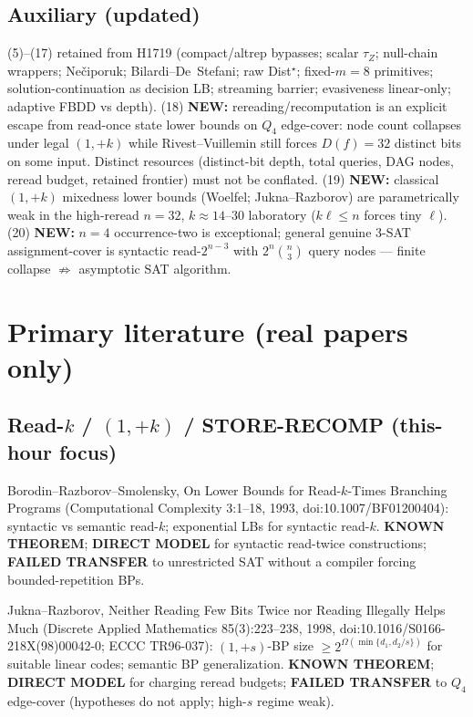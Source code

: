 \documentclass[11pt]{article}
\begin{document}
\subsection*{Auxiliary (updated)}
(5)--(17) retained from H1719 (compact/altrep bypasses; scalar $\tau_Z$; null-chain wrappers;
Ne\v{c}iporuk; Bilardi--De~Stefani; raw Dist$^\star$; fixed-$m=8$ primitives; solution-continuation
as decision LB; streaming barrier; evasiveness linear-only; adaptive FBDD vs depth).
(18) \textbf{NEW:} rereading/recomputation is an explicit escape from read-once state lower bounds
on $Q_4$ edge-cover: node count collapses under legal $(1,+k)$ while Rivest--Vuillemin still forces
$D(f)=32$ distinct bits on some input. Distinct resources (distinct-bit depth, total queries,
DAG nodes, reread budget, retained frontier) must not be conflated.
(19) \textbf{NEW:} classical $(1,+k)$ mixedness lower bounds (Woelfel; Jukna--Razborov) are
parametrically weak in the high-reread $n=32$, $k\approx14$--$30$ laboratory ($k\ell\le n$ forces
tiny $\ell$).
(20) \textbf{NEW:} $n=4$ occurrence-two is exceptional; general genuine 3-SAT assignment-cover
is syntactic read-$2^{n-3}$ with $2^n\binom{n}{3}$ query nodes --- finite collapse $\not\Rightarrow$
asymptotic SAT algorithm.

\section*{Primary literature (real papers only)}
\subsection*{Read-$k$ / $(1,+k)$ / STORE-RECOMP (this-hour focus)}
Borodin--Razborov--Smolensky, On Lower Bounds for Read-$k$-Times Branching Programs
(Computational Complexity 3:1--18, 1993, doi:10.1007/BF01200404):
syntactic vs semantic read-$k$; exponential LBs for syntactic read-$k$.
\textbf{KNOWN THEOREM}; \textbf{DIRECT MODEL} for syntactic read-twice constructions;
\textbf{FAILED TRANSFER} to unrestricted SAT without a compiler forcing bounded-repetition BPs.

Jukna--Razborov, Neither Reading Few Bits Twice nor Reading Illegally Helps Much
(Discrete Applied Mathematics 85(3):223--238, 1998, doi:10.1016/S0166-218X(98)00042-0;
ECCC TR96-037): $(1,+s)$-BP size $\ge2^{\Omega(\min\{d_1,d_2/s\})}$ for suitable linear codes;
semantic BP generalization.
\textbf{KNOWN THEOREM}; \textbf{DIRECT MODEL} for charging reread budgets;
\textbf{FAILED TRANSFER} to $Q_4$ edge-cover (hypotheses do not apply; high-$s$ regime weak).
\end{document}

